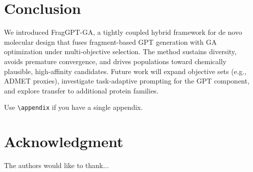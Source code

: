\documentclass[letterpaper,journal]{IEEEtran}
\begin{document}
\section{Conclusion}
We introduced FragGPT-GA, a tightly coupled hybrid framework for de novo molecular design that fuses fragment-based GPT generation with GA optimization under multi-objective selection. The method sustains diversity, avoids premature convergence, and drives populations toward chemically plausible, high-affinity candidates. Future work will expand objective sets (e.g., ADMET proxies), investigate task-adaptive prompting for the GPT component, and explore transfer to additional protein families.


Use \verb|\appendix| if you have a single appendix.

\section*{Acknowledgment}
The authors would like to thank...


\nocite{*} %


\end{document}
